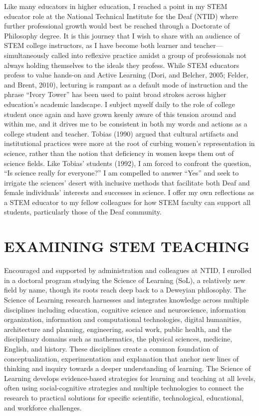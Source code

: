 \documentclass[11.5pt]{sig-alternate} %
\begin{document}
\begin{large}
Like many educators in higher education, I reached a point in my STEM educator role at the National Technical Institute for the Deaf (NTID) where further professional growth would best be reached through a Doctorate of Philosophy degree. It is this journey that I wish to share with an audience of STEM college instructors, as I have become both learner and teacher—simultaneously called into reflexive practice amidst a group of professionals not always holding themselves to the ideals they profess.  While STEM educators profess to value hands-on and Active Learning (Dori, and Belcher, 2005; Felder, and Brent, 2010), lecturing is rampant as a default mode of instruction and the phrase “Ivory Tower” has been used to paint broad strokes across higher education’s academic landscape.  I subject myself daily to the role of college student once again and have grown keenly aware of this tension around and within me, and it drives me to be consistent in both my words and actions as a college student and teacher. Tobias (1990) argued that cultural artifacts and institutional practices were more at the root of curbing women’s representation in science, rather than the notion that deficiency in women keeps them out of science fields. Like Tobias’ students (1992), I am forced to confront the question, “Is science really for everyone?”   I am compelled to answer “Yes” and seek to irrigate the sciences' desert with inclusive methods that facilitate both Deaf and female individuals’ interests and successes in science.  I offer my own reflections as a STEM educator to my fellow colleagues for how STEM faculty can support all students, particularly those of the Deaf community.   

\section*{EXAMINING STEM TEACHING}

Encouraged and supported by administration and colleagues at NTID, I enrolled in a doctoral program studying the Science of Learning (SoL), a relatively new field by name, though its roots reach deep back to a Deweyian philosophy. The Science of Learning research harnesses and integrates knowledge across multiple disciplines including education, cognitive science and neuroscience, information organization, information and computational technologies, digital humanities, architecture and planning, engineering, social work, public health, and the disciplinary domains such as mathematics, the physical sciences, medicine, English, and history. These disciplines create a common foundation of conceptualization, experimentation and explanation that anchor new lines of thinking and inquiry towards a deeper understanding of learning. The Science of Learning develops evidence-based strategies for learning and teaching at all levels, often using social-cognitive strategies and multiple technologies to connect the research to practical solutions for specific scientific, technological, educational, and workforce challenges.  


\end{large}
\end{document}
